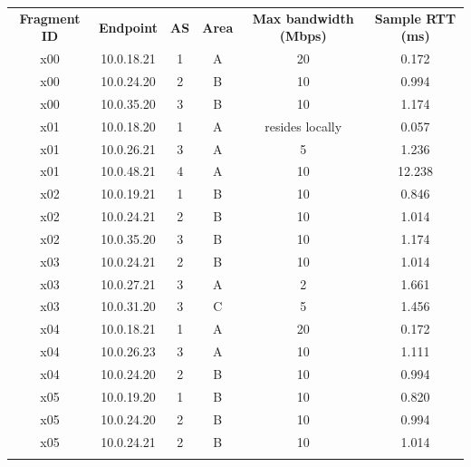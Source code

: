\begin{table}[H]
\centering
\hspace*{-2.5em}
\begin{tabular}{|c|c|c|c|c|c|}
    \hline
    \textbf{Fragment ID} & \textbf{Endpoint} & \textbf{AS} & \textbf{Area} & \textbf{Max bandwidth (Mbps)} & \textbf{Sample RTT (ms)}  \\ \thickhline
   x00   & 10.0.18.21   & 1  &  A  & 20               & 0.172  \\ \hline
   x00   & 10.0.24.20   & 2  &  B  & 10               & 0.994  \\ \hline
   x00   & 10.0.35.20   & 3  &  B  & 10               & 1.174  \\ \thickhline

   x01   & 10.0.18.20   & 1  &  A  & resides locally  & 0.057  \\ \hline
   x01   & 10.0.26.21   & 3  &  A  & 5                & 1.236  \\ \hline
   x01   & 10.0.48.21   & 4  &  A  & 10               & 12.238 \\ \thickhline

   x02   & 10.0.19.21   & 1  &  B  & 10               & 0.846  \\ \hline
   x02   & 10.0.24.21   & 2  &  B  & 10               & 1.014  \\ \hline
   x02   & 10.0.35.20   & 3  &  B  & 10               & 1.174  \\ \thickhline

   x03   & 10.0.24.21   & 2  &  B  & 10               & 1.014  \\ \hline
   x03   & 10.0.27.21   & 3  &  A  & 2                & 1.661  \\ \hline
   x03   & 10.0.31.20   & 3  &  C  & 5                & 1.456  \\ \thickhline
    
   x04   & 10.0.18.21   & 1  &  A  & 20               & 0.172  \\ \hline
   x04   & 10.0.26.23   & 3  &  A  & 10               & 1.111  \\ \hline
   x04   & 10.0.24.20   & 2  &  B  & 10               & 0.994  \\ \thickhline

   x05   & 10.0.19.20   & 1  &  B  & 10               & 0.820  \\ \hline
   x05   & 10.0.24.20   & 2  &  B  & 10               & 0.994  \\ \hline
   x05   & 10.0.24.21   & 2  &  B  & 10               & 1.014  \\ \thickhline


\end{tabular}
\end{table}
